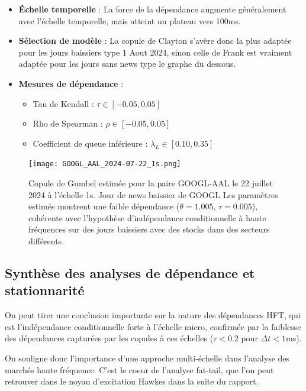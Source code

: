 \documentclass[10pt,a4paper]{article}
\theoremstyle{definition}
\theoremstyle{remark}
\begin{document}
\begin{itemize}
    \begin{itemize}
    \item \textbf{Échelle temporelle} : La force de la dépendance augmente généralement avec l'échelle temporelle, mais atteint un plateau vers 100ms.
    
    \item \textbf{Sélection de modèle} : La copule de Clayton s'avère donc la plus adaptée pour les jours baissiers type 1 Aout 2024, sinon celle de Frank est vraiment adaptée pour les jours sans news type le graphe du dessous.
    
    \item \textbf{Mesures de dépendance} :
    \begin{itemize}
        \item Tau de Kendall : $\tau \in [-0.05, 0.05]$
        \item Rho de Spearman : $\rho \in [-0.05, 0.05]$
        \item Coefficient de queue inférieure : $\lambda_L \in [0.10, 0.35]$
    \end{itemize}
    \end{itemize}
    
\begin{figure}[h!]
\centering
    \texttt{[image: GOOGL\_AAL\_2024-07-22\_1s.png]}
    \caption{Copule de Gumbel estimée pour la paire GOOGL-AAL le 22 juillet 2024 à l'échelle 1s. Jour de news baissier de GOOGL Les paramètres estimés montrent une faible dépendance ($\theta = 1.005$, $\tau = 0.005$), cohérente avec l'hypothèse d'indépendance conditionnelle à haute fréquences sur des jours baissiers avec des stocks dans des secteurs différents.}
    \label{fig:copula_example_app1}
\end{figure}




\subsection{Synthèse des analyses de dépendance et stationnarité}

On peut tirer une conclusion importante sur la nature des dépendances HFT, qui est l'indépendance conditionnelle forte à l'échelle micro, confirmée par la faiblesse des dépendances capturées par les copules à ces échelles ($\tau < 0.2$ pour $\Delta t < 1\text{ms}$).
    
    
On souligne donc l'importance d'une approche multi-échelle dans l'analyse des marchés haute fréquence. C'est le coeur de l'analyse fat-tail, que l'on peut retrouver dans le noyau d'excitation Hawkes dans la suite du rapport.


\end{itemize}
\end{document}
